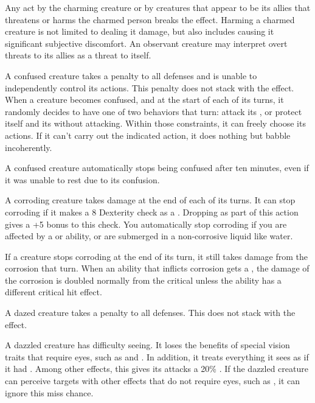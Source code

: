   Any act by the charming creature or by creatures that appear to be its allies that threatens or harms the charmed person breaks the effect.
  Harming a charmed creature is not limited to dealing it damage, but also includes causing it significant subjective discomfort.
  An observant creature may interpret overt threats to its allies as a threat to itself.

   A confused creature takes a  penalty to all defenses and is unable to independently control its actions.
  This penalty does not stack with the \dazed effect.
  When a creature becomes confused, and at the start of each of its turns, it randomly decides to have one of two behaviors that turn: attack its , or protect itself and its  without attacking.
  Within those constraints, it can freely choose its actions.
  If it can't carry out the indicated action, it does nothing but babble incoherently.

  A confused creature automatically stops being confused after ten minutes, even if it was unable to rest due to its confusion.

   A corroding creature takes damage at the end of each of its turns.
  It can stop corroding if it makes a  8 Dexterity check as a .
  Dropping \prone as part of this action gives a +5 bonus to this check.
  You automatically stop corroding if you are affected by a \atCold or \atFire ability, or are submerged in a non-corrosive liquid like water.

  If a creature stops corroding at the end of its turn, it still takes damage from the corrosion that turn.
  When an ability that inflicts corrosion gets a , the damage of the corrosion is doubled normally from the critical unless the ability has a different critical hit effect.

   A dazed creature takes a  penalty to all defenses.
  This does not stack with the \confused effect.

   A dazzled creature has difficulty seeing.
  It loses the benefits of special vision traits that require eyes, such as  and .
  In addition, it treats everything it sees as if it had .
  Among other effects, this gives its  attacks a 20\% .
  If the dazzled creature can perceive targets with other effects that do not require eyes, such as , it can ignore this miss chance.

